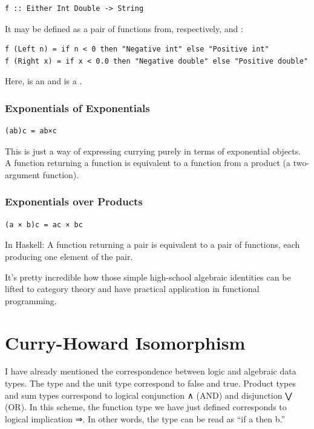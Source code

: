 \begin{verbatim}
f :: Either Int Double -> String
\end{verbatim}

It may be defined as a pair of functions from, respectively,
 and :

\begin{verbatim}
f (Left n) = if n < 0 then "Negative int" else "Positive int"
f (Right x) = if x < 0.0 then "Negative double" else "Positive double"
\end{verbatim}

Here,  is an  and  is a .

\subsubsection{Exponentials of
Exponentials}\label{exponentials-of-exponentials}

\begin{verbatim}
(ab)c = ab×c
\end{verbatim}

This is just a way of expressing currying purely in terms of exponential
objects. A function returning a function is equivalent to a function
from a product (a two-argument function).

\subsubsection{Exponentials over
Products}\label{exponentials-over-products}

\begin{verbatim}
(a × b)c = ac × bc
\end{verbatim}

In Haskell: A function returning a pair is equivalent to a pair of
functions, each producing one element of the pair.

It's pretty incredible how those simple high-school algebraic identities
can be lifted to category theory and have practical application in
functional programming.

\section{Curry-Howard Isomorphism}\label{curry-howard-isomorphism}

I have already mentioned the correspondence between logic and algebraic
data types. The  type and the unit type \code{()}
correspond to false and true. Product types and sum types correspond to
logical conjunction ∧ (AND) and disjunction ⋁ (OR). In this scheme, the
function type we have just defined corresponds to logical implication ⇒.
In other words, the type  can be read as ``if
a then b.''

